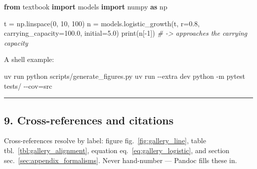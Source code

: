 \documentclass[
]{article}
\newenvironment{Shaded}{}{}
\newcommand{\AttributeTok}[1]{\textcolor[rgb]{0.49,0.56,0.16}{#1}}
\newcommand{\BuiltInTok}[1]{\textcolor[rgb]{0.00,0.50,0.00}{#1}}
\newcommand{\CommentTok}[1]{\textcolor[rgb]{0.38,0.63,0.69}{\textit{#1}}}
\newcommand{\DecValTok}[1]{\textcolor[rgb]{0.25,0.63,0.44}{#1}}
\newcommand{\ExtensionTok}[1]{#1}
\newcommand{\FloatTok}[1]{\textcolor[rgb]{0.25,0.63,0.44}{#1}}
\newcommand{\ImportTok}[1]{\textcolor[rgb]{0.00,0.50,0.00}{\textbf{#1}}}
\newcommand{\NormalTok}[1]{#1}
\newcommand{\OperatorTok}[1]{\textcolor[rgb]{0.40,0.40,0.40}{#1}}
\theoremstyle{plain}
\theoremstyle{definition}
\begin{document}
\begin{codelisting}

\caption{Calling the tested computational
backbone.}\label{lst:gallery_code}

\begin{Shaded}
\begin{Highlighting}[]
\ImportTok{from}\NormalTok{ textbook }\ImportTok{import}\NormalTok{ models}
\ImportTok{import}\NormalTok{ numpy }\ImportTok{as}\NormalTok{ np}

\NormalTok{t }\OperatorTok{=}\NormalTok{ np.linspace(}\DecValTok{0}\NormalTok{, }\DecValTok{10}\NormalTok{, }\DecValTok{100}\NormalTok{)}
\NormalTok{n }\OperatorTok{=}\NormalTok{ models.logistic\_growth(t, r}\OperatorTok{=}\FloatTok{0.8}\NormalTok{, carrying\_capacity}\OperatorTok{=}\FloatTok{100.0}\NormalTok{, initial}\OperatorTok{=}\FloatTok{5.0}\NormalTok{)}
\BuiltInTok{print}\NormalTok{(n[}\OperatorTok{{-}}\DecValTok{1}\NormalTok{])  }\CommentTok{\# {-}\textgreater{} approaches the carrying capacity}
\end{Highlighting}
\end{Shaded}

\end{codelisting}

A shell example:

\begin{Shaded}
\begin{Highlighting}[]
\ExtensionTok{uv}\NormalTok{ run python scripts/generate\_figures.py}
\ExtensionTok{uv}\NormalTok{ run }\AttributeTok{{-}{-}extra}\NormalTok{ dev python }\AttributeTok{{-}m}\NormalTok{ pytest tests/ }\AttributeTok{{-}{-}cov}\OperatorTok{=}\NormalTok{src}
\end{Highlighting}
\end{Shaded}

\begin{center}\rule{0.5\linewidth}{0.5pt}\end{center}

\subsection{9. Cross-references and
citations}\label{cross-references-and-citations}

Cross-references resolve by label: figure fig.~\ref{fig:gallery_line},
table tbl.~\ref{tbl:gallery_alignment}, equation
eq.~\ref{eq:gallery_logistic}, and section
sec.~\ref{sec:appendix_formalisms}. Never hand-number --- Pandoc fills
these in.
\end{document}
